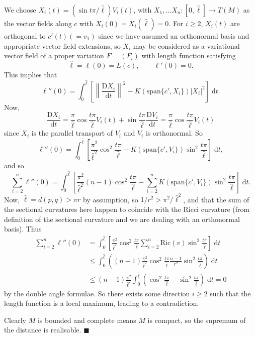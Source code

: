 \documentclass[letter-paper]{tufte-book}
\newenvironment{proof}[1][Proof]{\begin{trivlist}
\item[\hskip \labelsep {\bfseries #1}]}{\end{trivlist}}
\newcommand{\qed}{\hfill$\blacksquare$}
\begin{document}
\begin{proof}
  We choose $X_i(t) = (\sin t\pi / \hat{\ell})V_i(t)$, with $X_1,\ldots X_n : [0, \hat{\ell}] \to T(M)$ as the vector fields along $c$ with $X_i(0) = X_i(\hat{\ell}) = 0$. For $i\geq 2$, $X_i(t)$ are orthogonal to $c'(t) (=v_1)$ since we have assumed an orthonormal basis and appropriate vector field extensions, so $X_i$ may be considered as a variational vector field of a proper variation $F = (F_i)$ with length function satisfying
  \begin{equation*}
    \hat{\ell} = \ell(0) = L(c), \qquad \ell'(0) = 0.
  \end{equation*}
  This implies that
  \begin{equation*}
    \ell''(0) = \int_0^{\hat{\ell}} \left[ \left\|\frac{\mathrm{D}X_i}{\mathrm{d}t} \right\|^2 - K(\mbox{span}\{c', X_i\}) \left|X_i\right|^2 \right]\; \mathrm{d}t.
  \end{equation*}
  Now,
  \begin{equation*}
    \frac{\mathrm{D}X_i}{\mathrm{d}t} = \frac{\pi}{\hat{\ell}}\cos\frac{t\pi}{\hat{\ell}} V_i(t) + \sin\frac{t\pi}{\hat{\ell}} \frac{\mathrm{D}V_i}{\mathrm{d}t} = \frac{\pi}{\hat{\ell}}\cos\frac{t\pi}{\hat{\ell}} V_i(t)
  \end{equation*}
  since $X_i$ is the parallel transport of $V_i$ and $V_i$ is orthonormal. So
  \begin{equation*}
    \ell''(0) = \int_0^{\hat{\ell}} \left[ \frac{\pi^2}{\hat{\ell}^2}\cos^2\frac{t\pi}{\hat{\ell}} - K(\mbox{span}\{c', V_i\}) \sin^2\frac{t\pi}{\hat{\ell}} \right]\; \mathrm{d}t,
  \end{equation*}
  and so
  \begin{equation*}
    \sum_{i=2}^n \ell''(0) = \int_0^{\hat{\ell}} \left[ \frac{\pi^2}{\hat{\ell}^2}(n-1)\cos^2\frac{t\pi}{\hat{\ell}} - \sum_{i=2}^n K(\mbox{span}\{c', V_i\}) \sin^2\frac{t\pi}{\hat{\ell}} \right]\; \mathrm{d}t.
  \end{equation*}
  Now, $\hat{\ell} = d(p,q) > \pi r$ by assumption, so $1/r^2 > \pi^2 / \hat{\ell}^2$, and that the sum of the sectional curvatures here happen to coincide with the Ricci curvature (from definition of the sectional curvature and we are dealing with an orthonormal basis). Thus
  \begin{align*}
    \sum_{i=2}^n \ell''(0)
      &= \int_0^{\hat{\ell}} \left[ \frac{\pi^2}{\hat{\ell}^2}\cos^2\frac{t\pi}{\hat{\ell}} \sum_{i=2}^n \mbox{Ric}(v) \sin^2\frac{t\pi}{\hat{\ell}} \right]\; \mathrm{d}t\\
      &\leq \int_0^{\hat{\ell}} \left((n-1)\frac{\pi^2}{\hat{\ell}^2}\cos^2\frac{t\pi}{\hat{\ell}} \frac{n-1}{r^2} \sin^2\frac{t\pi}{\hat{\ell}} \right)\; \mathrm{d}t\\
      &\leq (n-1)\frac{\pi^2}{\hat{\ell}^2}\int_0^{\hat{\ell}} \left(\cos^2\frac{t\pi}{\hat{\ell}} - \sin^2\frac{t\pi}{\hat{\ell}} \right)\; \mathrm{d}t = 0
  \end{align*}
  by the double angle formulae. So there exists some direction $i\geq 2$ such that the length function is a local maximum, leading to a contradiction.
  
  Clearly $M$ is bounded and complete means $M$ is compact, so the supremum of the distance is realisable. \qed
\end{proof}
\end{document}
